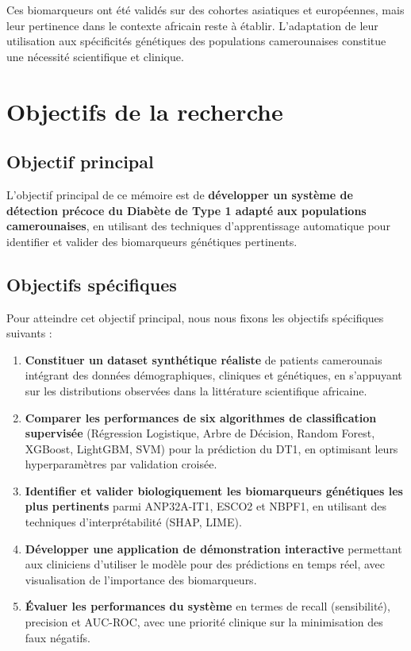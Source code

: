 Ces biomarqueurs ont été validés sur des cohortes asiatiques et européennes, mais leur pertinence dans le contexte africain reste à établir. L'adaptation de leur utilisation aux spécificités génétiques des populations camerounaises constitue une nécessité scientifique et clinique.

\section{Objectifs de la recherche}

\subsection{Objectif principal}

L'objectif principal de ce mémoire est de \textbf{développer un système de détection précoce du Diabète de Type 1 adapté aux populations camerounaises}, en utilisant des techniques d'apprentissage automatique pour identifier et valider des biomarqueurs génétiques pertinents.

\subsection{Objectifs spécifiques}

Pour atteindre cet objectif principal, nous nous fixons les objectifs spécifiques suivants :

\begin{enumerate}
    \item \textbf{Constituer un dataset synthétique réaliste} de patients camerounais intégrant des données démographiques, cliniques et génétiques, en s'appuyant sur les distributions observées dans la littérature scientifique africaine.

    \item \textbf{Comparer les performances de six algorithmes de classification supervisée} (Régression Logistique, Arbre de Décision, Random Forest, XGBoost, LightGBM, SVM) pour la prédiction du DT1, en optimisant leurs hyperparamètres par validation croisée.

    \item \textbf{Identifier et valider biologiquement les biomarqueurs génétiques les plus pertinents} parmi ANP32A-IT1, ESCO2 et NBPF1, en utilisant des techniques d'interprétabilité (SHAP, LIME).

    \item \textbf{Développer une application de démonstration interactive} permettant aux cliniciens d'utiliser le modèle pour des prédictions en temps réel, avec visualisation de l'importance des biomarqueurs.

    \item \textbf{Évaluer les performances du système} en termes de recall (sensibilité), precision et AUC-ROC, avec une priorité clinique sur la minimisation des faux négatifs.
\end{enumerate}


